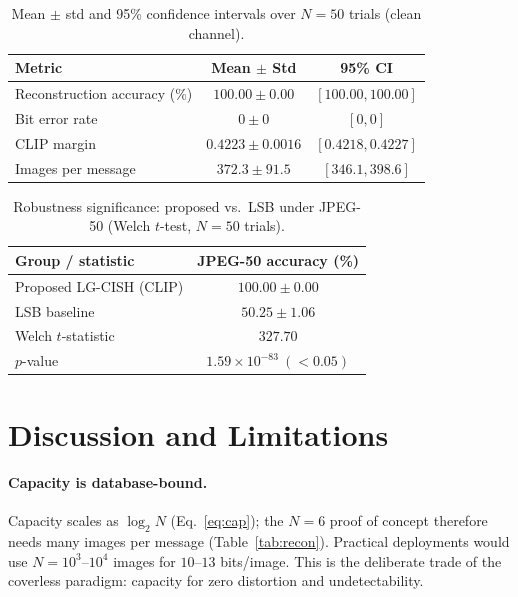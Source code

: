 \documentclass[10pt]{article}
\begin{document}
\begin{table}[t]
\centering
\caption{Mean $\pm$ std and 95\% confidence intervals over $N{=}50$ trials (clean channel).}\label{tab:stats}
\begin{tabular}{@{}lcc@{}}
\toprule
Metric & Mean $\pm$ Std & 95\% CI \\
\midrule
Reconstruction accuracy (\%) & $100.00\pm0.00$ & $[100.00,100.00]$ \\
Bit error rate               & $0\pm0$         & $[0,0]$ \\
CLIP margin                  & $0.4223\pm0.0016$ & $[0.4218,0.4227]$ \\
Images per message           & $372.3\pm91.5$  & $[346.1,398.6]$ \\
\bottomrule
\end{tabular}
\end{table}

\begin{table}[t]
\centering
\caption{Robustness significance: proposed vs.\ LSB under JPEG-50 (Welch $t$-test, $N{=}50$ trials).}\label{tab:signif}
\begin{tabular}{@{}lc@{}}
\toprule
Group / statistic & JPEG-50 accuracy (\%) \\
\midrule
Proposed LG-CISH (CLIP) & $100.00\pm0.00$ \\
LSB baseline            & $50.25\pm1.06$ \\
\midrule
Welch $t$-statistic & $327.70$ \\
$p$-value           & $1.59\times10^{-83}\ (<0.05)$ \\
\bottomrule
\end{tabular}
\end{table}

\section{Discussion and Limitations}\label{sec:discussion}
\paragraph{Capacity is database-bound.}
Capacity scales as $\log_2 N$ (Eq.~\eqref{eq:cap}); the $N{=}6$ proof of concept
therefore needs many images per message (Table~\ref{tab:recon}). Practical
deployments would use $N{=}10^3$--$10^4$ images for $10$--$13$ bits/image. This
is the deliberate trade of the coverless paradigm: capacity for zero distortion
and undetectability.
\end{document}
